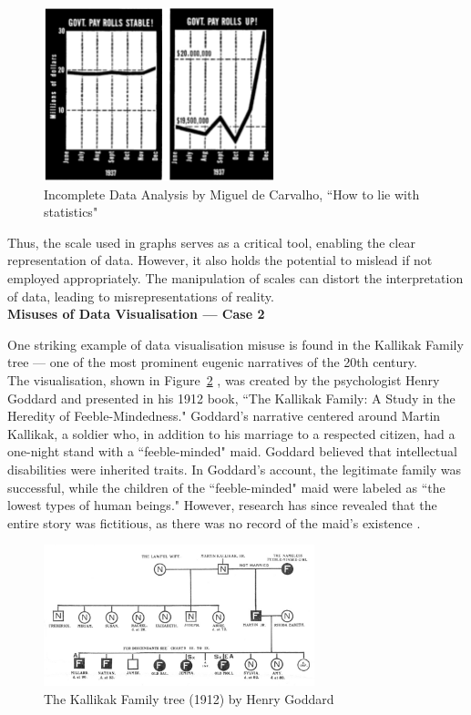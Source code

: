 \documentclass{article}\usepackage[]{graphicx}\usepackage[]{xcolor}
\numberwithin{equation}{section}
\begin{document}
\begin{figure}[H]
    \centering
    \includegraphics[width=0.6\textwidth]{image_reference/misuse1.png}
    \caption{Incomplete Data Analysis by Miguel de Carvalho, ``How to lie with statistics" \cite{liestats}}
    \label{fig:misuse1}
\end{figure}

\noindent 
Thus, the scale used in graphs serves as a critical tool, enabling the clear representation of data. However, it also holds the potential to mislead if not employed appropriately. The manipulation of scales can distort the interpretation of data, leading to misrepresentations of reality.\\

\noindent 
\textbf{Misuses of Data Visualisation — Case 2}

\noindent
One striking example of data visualisation misuse is found in the Kallikak Family tree — one of the most prominent eugenic narratives of the 20th century.\\

\noindent
The visualisation, shown in Figure~\ref{fig:familytree} \cite{ktree}, was created by the psychologist Henry Goddard and presented in his 1912 book, ``The Kallikak Family: A Study in the Heredity of Feeble-Mindedness." Goddard's narrative centered around Martin Kallikak, a soldier who, in addition to his marriage to a respected citizen, had a one-night stand with a ``feeble-minded" maid. Goddard believed that intellectual disabilities were inherited traits. In Goddard's account, the legitimate family was successful, while the children of the ``feeble-minded" maid were labeled as ``the lowest types of human beings." However, research has since revealed that the entire story was fictitious, as there was no record of the maid's existence \cite{fakedata}.\\

\begin{figure}[H]
    \centering
    \includegraphics[width=0.7\textwidth]{image_reference/familytree.jpg}
    \caption{The Kallikak Family tree (1912) by Henry Goddard}
    \label{fig:familytree}
\end{figure}
\end{document}
